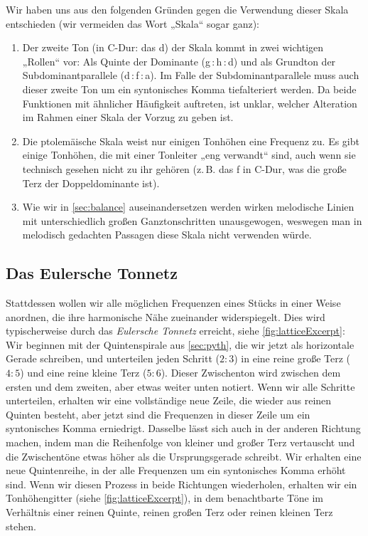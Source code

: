 Wir haben uns aus den folgenden Gründen gegen die Verwendung dieser Skala
entschieden (wir vermeiden das Wort „Skala“ sogar ganz):
\begin{enumerate}
\item Der zweite Ton (in C-Dur: das d) der Skala kommt in zwei wichtigen
  „Rollen“ vor: Als Quinte der Dominante (g\,:\,h\,:\,d) und als Grundton der
  Subdominantparallele (d\,:\,f\,:\,a). Im Falle der Subdominantparallele muss auch
  dieser zweite Ton um ein syntonisches Komma tiefalteriert werden. Da beide
  Funktionen mit ähnlicher Häufigkeit auftreten, ist unklar, welcher Alteration
  im Rahmen einer Skala der Vorzug zu geben ist.
\item Die ptolemäische Skala weist nur einigen Tonhöhen eine Frequenz zu. Es
  gibt einige Tonhöhen, die mit einer Tonleiter „eng verwandt“ sind, auch wenn
  sie technisch gesehen nicht zu ihr gehören (z.\,B. das \sharp f in C-Dur, was
  die große Terz der Doppeldominante ist).
\item Wie wir in \cref{sec:balance} auseinandersetzen werden wirken melodische
  Linien mit unterschiedlich großen Ganztonschritten unausgewogen, weswegen man
  in melodisch gedachten Passagen diese Skala nicht verwenden würde.
\end{enumerate}

\subsection{Das Eulersche Tonnetz}

Stattdessen wollen wir alle möglichen Frequenzen eines Stücks in einer Weise
anordnen, die ihre harmonische Nähe zueinander widerspiegelt. Dies wird
typischerweise durch das \emph{Eulersche Tonnetz} erreicht, siehe
\cref{fig:latticeExcerpt}: Wir beginnen mit der Quintenspirale aus
\cref{sec:pyth}, die wir jetzt als horizontale Gerade schreiben, und unterteilen
jeden Schritt ($2:3$) in eine reine große Terz ($4:5$) und eine reine kleine
Terz ($5:6$). Dieser Zwischenton wird zwischen dem ersten und dem zweiten, aber
etwas weiter unten notiert. Wenn wir alle Schritte unterteilen, erhalten wir
eine vollständige neue Zeile, die wieder aus reinen Quinten besteht, aber jetzt
sind die Frequenzen in dieser Zeile um ein syntonisches Komma
erniedrigt. Dasselbe lässt sich auch in der anderen Richtung machen, indem man
die Reihenfolge von kleiner und großer Terz vertauscht und die Zwischentöne
etwas höher als die Ursprungsgerade schreibt. Wir erhalten eine neue
Quintenreihe, in der alle Frequenzen um ein syntonisches Komma erhöht sind. Wenn
wir diesen Prozess in beide Richtungen wiederholen, erhalten wir ein
Tonhöhengitter (siehe \cref{fig:latticeExcerpt}), in dem benachtbarte Töne im
Verhältnis einer reinen Quinte, reinen großen Terz oder reinen kleinen Terz
stehen.


